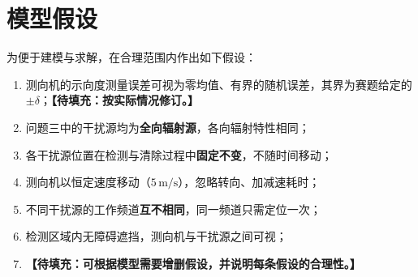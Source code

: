 \section{模型假设}
为便于建模与求解，在合理范围内作出如下假设：

\begin{enumerate}
    \item 测向机的示向度测量误差可视为零均值、有界的随机误差，其界为赛题给定的
          $\pm\delta$；\textbf{【待填充：按实际情况修订。】}
    \item 问题三中的干扰源均为\textbf{全向辐射源}，各向辐射特性相同；
    \item 各干扰源位置在检测与清除过程中\textbf{固定不变}，不随时间移动；
    \item 测向机以恒定速度移动（$5\,\mathrm{m/s}$），忽略转向、加减速耗时；
    \item 不同干扰源的工作频道\textbf{互不相同}，同一频道只需定位一次；
    \item 检测区域内无障碍遮挡，测向机与干扰源之间可视；
    \item \textbf{【待填充：可根据模型需要增删假设，并说明每条假设的合理性。】}
\end{enumerate}
